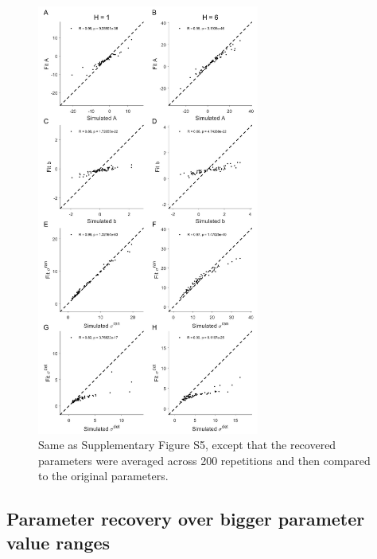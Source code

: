 \documentclass[12pt]{article}
\begin{document}
	\begin{figure}[hp]
		\begin{center}
			\includegraphics[width=0.65\textwidth]{figures/RDBayes_parameterrecovery_subject.jpg}
			\caption{Same as Supplementary Figure S5, except that the recovered parameters were averaged across 200 repetitions and then compared to the original parameters.}
			\label{fig:paramrecover_sub}
		\end{center}
	\end{figure} 
	
	
	\newpage	
	\subsection{Parameter recovery over bigger parameter value ranges}
	
	
\end{document}
